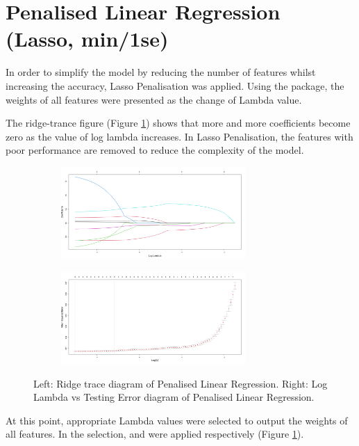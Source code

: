 \section{Penalised Linear Regression (Lasso, min/1se)} %

In order to simplify the model by reducing the number of features whilst increasing the accuracy, Lasso Penalisation was applied. Using the  package, the weights of all features were presented as the change of Lambda value.

The ridge-trance figure (Figure \ref{4.2.2-NEW-PLR-ridge-trance-Log-Lambda}) shows that more and more coefficients become zero as the value of log lambda increases. In Lasso Penalisation, the features with poor performance are removed to reduce the complexity of the model.


\begin{figure}[htbp]
\center
  \begin{subfigure}{7.5cm}
    \centering\includegraphics[width=7cm]{Figure/4.2.2-PLR-ridge-trance.png}
  \end{subfigure}
  \begin{subfigure}{7.5cm}
    \centering\includegraphics[width=7cm]{Figure/4.2.2-PLR-Log-Lambda-vs-Testing-Error.png}
  \end{subfigure}
  \caption{Left: Ridge trace diagram of Penalised Linear Regression. Right: Log Lambda vs Testing Error diagram of Penalised Linear Regression.}
  \label{4.2.2-NEW-PLR-ridge-trance-Log-Lambda}
\end{figure}


At this point, appropriate Lambda values were selected to output the weights of all features. In the selection,  and  were applied respectively (Figure \ref{4.2.2-NEW-PLR-ridge-trance-Log-Lambda}).


